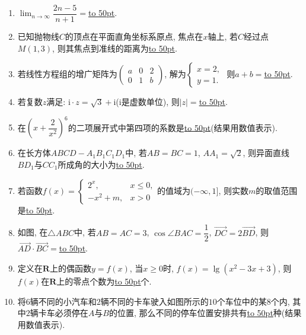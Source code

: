 \documentclass[10pt,a4paper]{article}
\newcommand{\blank}[1]{\underline{\hbox to #1pt{}}}
\begin{document}
\begin{enumerate}[1.]
\item $\displaystyle\lim_{n\to \infty}\dfrac{2n-5}{n+1}=$\blank{50}.
\item 已知抛物线$C$的顶点在平面直角坐标系原点, 焦点在$x$轴上, 若$C$经过点$M(1,3)$, 则其焦点到准线的距离为\blank{50}.
\item 若线性方程组的增广矩阵为$\begin{pmatrix}    a & 0 & 2 \\ 0 & 1 & b\end{pmatrix}$, 解为$\begin{cases}    x=2, \\ y=1.\end{cases}$ 则$a+b=$\blank{50}.
\item 若复数$z$满足: $\mathrm{i}\cdot z=\sqrt{3}+\mathrm{i}$($\mathrm{i}$是虚数单位), 则$|z|=$\blank{50}.
\item 在$(x+\dfrac{2}{x^2})^6$的二项展开式中第四项的系数是\blank{50}(结果用数值表示).
\item 在长方体$ABCD-A_1B_1C_1D_1$中, 若$AB=BC=1$, $AA_1=\sqrt{2}$, 则异面直线$BD_1$与$CC_1$所成角的大小为\blank{50}.
\item 若函数$f(x)=\begin{cases}    2^x, & x\le 0, \\ -x^2+m, & x>0 \end{cases}$的值域为$(-\infty ,1]$, 则实数$m$的取值范围是\blank{50}.
\item 如图, 在$\triangle ABC$中, 若$AB=AC=3$, $\cos \angle BAC=\dfrac{1}{2}$, $\overrightarrow{DC}=2\overrightarrow{BD}$, 则$\overrightarrow{AD}\cdot \overrightarrow{BC}=$\blank{50}.
\begin{center}
\end{center}
\item 定义在$\mathbf{R}$上的偶函数$y=f(x)$, 当$x\ge 0$时, $f(x)=\lg (x^2-3x+3)$, 则$f(x)$在$\mathbf{R}$上的零点个数为\blank{50}个.
\item 将$6$辆不同的小汽车和$2$辆不同的卡车驶入如图所示的$10$个车位中的某$8$个内, 其中$2$辆卡车必须停在$A$与$B$的位置, 那么不同的停车位置安排共有\blank{50}种(结果用数值表示).
\begin{center}
\end{center}


\end{enumerate}
\end{document}
